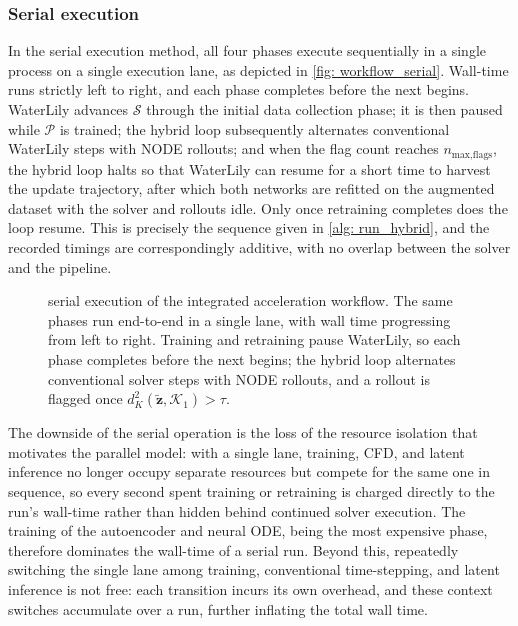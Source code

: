 \subsubsection{Serial execution}
\label{subsect: serial_exec}
In the serial execution method, all four phases execute sequentially in a single process on a single execution lane, as depicted in \autoref{fig: workflow_serial}. Wall-time runs strictly left to right, and each phase completes before the next begins. WaterLily advances $\mathcal{S}$ through the initial data collection phase; it is then paused while $\mathcal{P}$ is trained; the hybrid loop subsequently alternates conventional WaterLily steps with NODE rollouts; and when the flag count reaches $n_\text{max,flags}$, the hybrid loop halts so that WaterLily can resume for a short time to harvest the update trajectory, after which both networks are refitted on the augmented dataset with the solver and rollouts idle. Only once retraining completes does the loop resume. This is precisely the sequence given in \autoref{alg: run_hybrid}, and the recorded timings are correspondingly additive, with no overlap between the solver and the pipeline.

\begin{figure}[htbp]
    \centering
    
    \caption{serial execution of the integrated acceleration workflow. The same phases run end-to-end in a single lane, with wall time progressing from left to right. Training and retraining pause WaterLily, so each phase completes before the next begins; the hybrid loop alternates conventional solver steps with NODE rollouts, and a rollout is flagged once $d_K^2(\tilde{\mathbf{z}},\mathcal{K}_1) > \tau$.}
\label{fig: workflow_serial}
\end{figure}

The downside of the serial operation is the loss of the resource isolation that motivates the parallel model: with a single lane, training, CFD, and latent inference no longer occupy separate resources but compete for the same one in sequence, so every second spent training or retraining is charged directly to the run's wall-time rather than hidden behind continued solver execution. The training of the autoencoder and neural ODE, being the most expensive phase, therefore dominates the wall-time of a serial run. Beyond this, repeatedly switching the single lane among training, conventional time-stepping, and latent inference is not free: each transition incurs its own overhead, and these context switches accumulate over a run, further inflating the total wall time.


